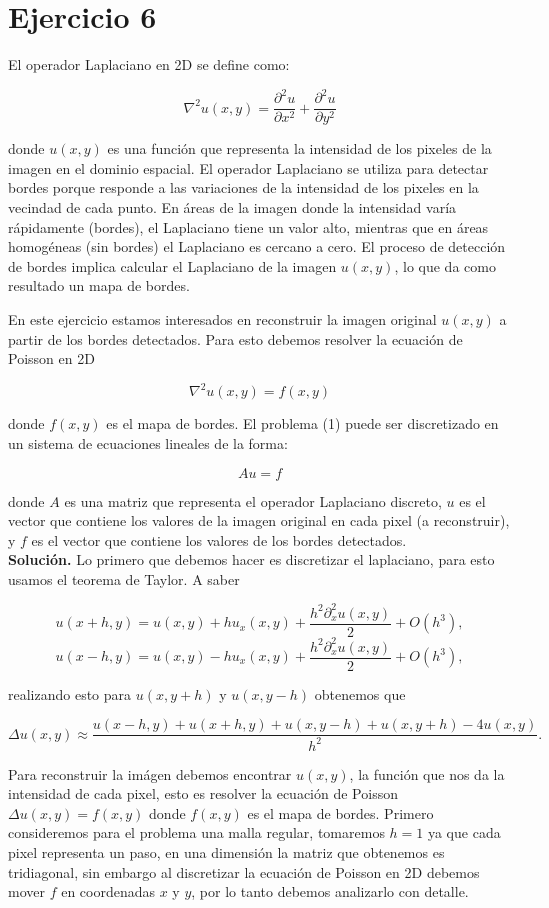 
\section*{Ejercicio 6}
El operador Laplaciano en 2D se define como:

$$
\nabla^2 u(x, y)=\frac{\partial^2 u}{\partial x^2}+\frac{\partial^2 u}{\partial y^2}
$$

donde $u(x, y)$ es una función que representa la intensidad de los pixeles de la imagen en el dominio espacial. El operador Laplaciano se utiliza para detectar bordes porque responde a las variaciones de la intensidad de los pixeles en la vecindad de cada punto. En áreas de la imagen donde la intensidad varía rápidamente (bordes), el Laplaciano tiene un valor alto, mientras que en áreas homogéneas (sin bordes) el Laplaciano es cercano a cero. El proceso de detección de bordes implica calcular el Laplaciano de la imagen $u(x, y)$, lo que da como resultado un mapa de bordes.

En este ejercicio estamos interesados en reconstruir la imagen original $u(x, y)$ a partir de los bordes detectados. Para esto debemos resolver la ecuación de Poisson en 2D

$$
\nabla^2 u(x, y)=f(x, y)
$$

donde $f(x, y)$ es el mapa de bordes.
El problema (1) puede ser discretizado en un sistema de ecuaciones lineales de la forma:

$$
A u=f
$$

donde $A$ es una matriz que representa el operador Laplaciano discreto, $u$ es el vector que contiene los valores de la imagen original en cada pixel (a reconstruir), y $f$ es el vector que contiene los valores de los bordes detectados.\\

\textbf{Solución.} Lo primero que debemos hacer es  discretizar el laplaciano,  para esto usamos el teorema de Taylor. A saber

    $$u(x+h,y)=u(x,y)+h u_x(x,y)+\frac{h^2\partial^2_{x}u(x,y)}{2}+O(h^3),$$
    $$u(x-h,y)=u(x,y)-h u_x(x,y)+\frac{h^2\partial^2_x u(x,y)}{2}+O(h^3),$$

    realizando esto para $u(x,y+h)$ y $u(x,y-h)$ obtenemos que

    $$\Delta u(x, y) \approx \frac{u(x-h, y)+u(x+h, y)+u(x, y-h)+u(x, y+h)-4 u(x, y)}{h^2}.$$

    Para reconstruir la imágen debemos encontrar $u(x,y)$, la función que nos da la intensidad de cada pixel, esto es resolver la ecuación de  Poisson $\Delta u(x,y)= f(x,y)$ donde $f(x,y)$ es el mapa de bordes. Primero consideremos para el problema una malla regular, tomaremos $h=1$ ya que cada pixel representa un paso, en una  dimensión la matriz que obtenemos es tridiagonal, sin embargo al discretizar la ecuación de Poisson en 2D debemos mover $f$ en coordenadas $x$ y $y$, por lo tanto debemos analizarlo con detalle.\\

